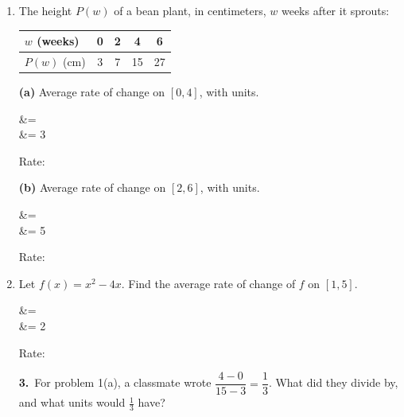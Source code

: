 \documentclass[10pt]{article}
\begin{document}
\begin{enumerate}[leftmargin=1.9em, itemsep=9pt]

\item The height $P(w)$ of a bean plant, in centimeters, $w$ weeks after it sprouts:
      \quad
      \renewcommand{\arraystretch}{1.2}%
      \begin{tabular}{|l|c|c|c|c|}
      \hline
      $w$ (weeks) & 0 & 2 & 4  & 6  \\ \hline
      $P(w)$ (cm) & 3 & 7 & 15 & 27 \\ \hline
      \end{tabular}

      \smallskip
      \begin{minipage}[t]{0.48\linewidth}
      \textbf{(a)} Average rate of change on $[0, 4]$, with units.

\begin{work}
   &=  \\
                            &= 3
\end{work}

      Rate: 
      \end{minipage}\hfill
      \begin{minipage}[t]{0.48\linewidth}
      \textbf{(b)} Average rate of change on $[2, 6]$, with units.

\begin{work}
   &=  \\
                            &= 5
\end{work}

      Rate: 
      \end{minipage}

\item \begin{minipage}[t]{0.44\linewidth}
      Let $f(x) = x^2 - 4x$. Find the average rate of change of $f$ on $[1, 5]$.

\begin{work}
   &=  \\
                            &= 2
\end{work}

      Rate: 
      \end{minipage}\hfill
      \begin{minipage}[t]{0.50\linewidth}
      \textbf{3.}\ For problem 1(a), a classmate wrote $\dfrac{4 - 0}{15 - 3} = \dfrac{1}{3}$.
      What did they divide by, and what units would $\tfrac{1}{3}$ have?
      \end{minipage}
\setcounter{enumi}{3}

\end{enumerate}
\end{document}
